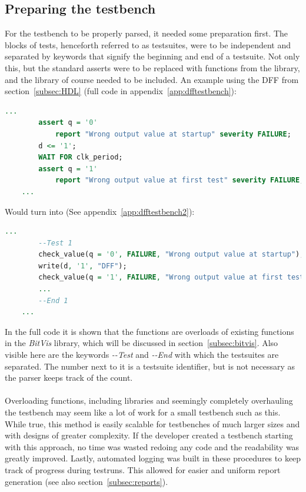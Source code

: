 \documentclass[11pt,british]{article}
\begin{document}
\subsection{Preparing the testbench}
\label{subsec:preparing}
For the testbench to be properly parsed, it needed some preparation first. The blocks of tests, henceforth referred to as testsuites, were to be independent and separated by keywords that signify the beginning and end of a testsuite. Not only this, but the standard asserts were to be replaced with functions from the library, and the library of course needed to be included. An example using the \gls{DFF} from section~\ref{subsec:HDL} (full code in appendix~\ref{app:dfftestbench}):
\begin{lstlisting}[language=VHDL, tabsize=4, frame=single, framesep=2mm, belowskip=8pt, aboveskip=8pt, showstringspaces=false, basicstyle=\footnotesize]
	...
		assert q = '0'
			report "Wrong output value at startup" severity FAILURE;
		d <= '1';
     	WAIT FOR clk_period;
     	assert q = '1'
			report "Wrong output value at first test" severity FAILURE;
	...
\end{lstlisting}
Would turn into (See appendix~\ref{app:dfftestbench2}):
\begin{lstlisting}[language=VHDL, tabsize=4, frame=single, framesep=2mm, belowskip=8pt, aboveskip=8pt, showstringspaces=false, basicstyle=\footnotesize]
	...
		--Test 1
		check_value(q = '0', FAILURE, "Wrong output value at startup");
		write(d, '1', "DFF");
		check_value(q = '1', FAILURE, "Wrong output value at first test");
		...
		--End 1
	...
\end{lstlisting}
In the full code it is shown that the functions are overloads of existing functions in the \emph{BitVis} library, which will be discussed in section~\ref{subsec:bitvis}. Also visible here are the keywords \emph{-\--Test} and \emph{-\--End} with which the testsuites are separated. The number next to it is a testsuite identifier, but is not necessary as the parser keeps track of the count.
\\
\\
Overloading functions, including libraries and seemingly completely overhauling the testbench may seem like a lot of work for a small testbench such as this. While true, this method is easily scalable for testbenches of much larger sizes and with designs of greater complexity. If the developer created a testbench starting with this approach, no time was wasted redoing any code and the readability was greatly improved. Lastly, automated logging was built in these procedures to keep track of progress during testruns. This allowed for easier and uniform report generation (see also section~\ref{subsec:reports}).
\end{document}
